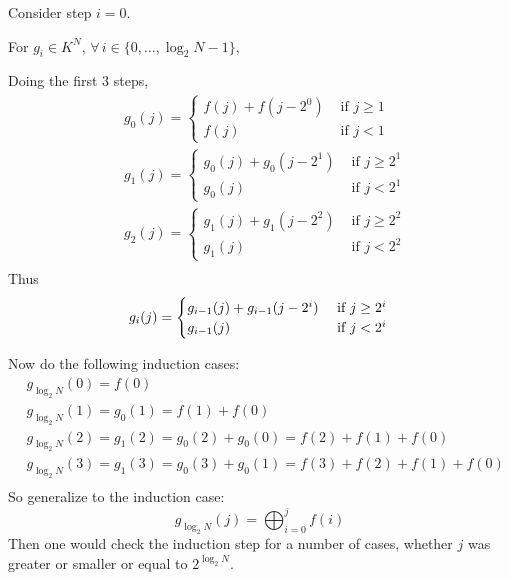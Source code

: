 \documentclass[10pt]{amsart}
\begin{document}
\begin{multicols*}{2}
Consider step $i=0$.

For $g_i \in K^N$, $\forall \, i\in \lbrace 0 , \dots , \log_2{N}-1 \rbrace$, 

Doing the first 3 steps,
\[
\begin{aligned}
  & g_0(j) = \begin{cases} f(j) + f(j-2^0) & \text{ if } j \geq 1 \\
    f(j) & \text{ if } j < 1 \end{cases} \\
  & g_1(j) = \begin{cases} g_0(j) + g_0(j-2^1) & \text{ if } j \geq 2^1 \\
    g_0(j) & \text{ if } j < 2^1 \end{cases} \\
  & g_2(j) = \begin{cases} g_1(j) + g_1(j-2^2) & \text{ if } j \geq 2^2 \\
    g_1(j) & \text{ if } j < 2^2 \end{cases} \\
\end{aligned}
\]
Thus
\[
   g_i(j) = \begin{cases} g_{i-1}(j) + g_{i-1}(j-2^i) & \text{ if } j \geq 2^i \\
    g_{i-1}(j) & \text{ if } j < 2^i \end{cases} \\
\]

Now do the following induction cases:
\[
\begin{aligned}
  & g_{\log_2{N}}(0) = f(0) \\ 
  & g_{\log_2{N}}(1) = g_0(1) = f(1) + f(0) \\
  & g_{\log_2{N}}(2) = g_1(2) = g_0(2) + g_0(0) = f(2)+f(1) + f(0) \\
  & g_{\log_2{N}}(3) = g_1(3) = g_0(3) + g_0(1) = f(3)+f(2)+f(1)+f(0)  \\
\end{aligned}
\]
So generalize to the induction case:
\[
g_{ \log_2{N} }(j) = \bigoplus_{i=0}^j f(i)
\]
Then one would check the induction step for a number of cases, whether $j$ was greater or smaller or equal to $2^{ \log_2{N}}$.  


\end{multicols*}
\end{document}
